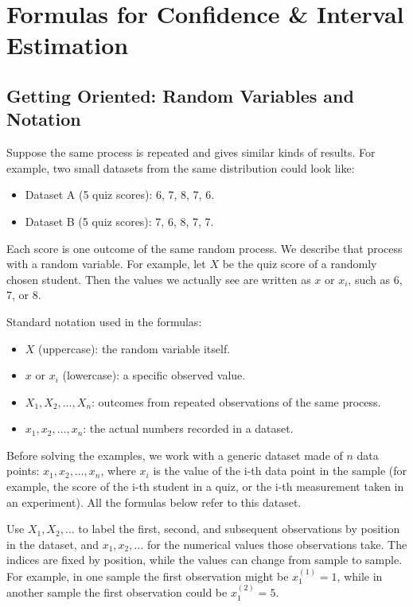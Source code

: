 \section{Formulas for Confidence \& Interval Estimation}\label{sec:interval-formulas}

\subsection{Getting Oriented: Random Variables and Notation}\label{sec:interval-notation}

Suppose the same process is repeated and gives similar kinds of results. For example, two small datasets from the same distribution could look like:

\begin{itemize}
	\item Dataset A (5 quiz scores): 6, 7, 8, 7, 6.
	\item Dataset B (5 quiz scores): 7, 6, 8, 7, 7.
\end{itemize}

Each score is one outcome of the same random process. We describe that process with a random variable. For example, let \(X\) be the quiz score of a randomly chosen student. Then the values we actually see are written as \(x\) or \(x_i\), such as 6, 7, or 8.

Standard notation used in the formulas:

\begin{itemize}
	\item \(X\) (uppercase): the random variable itself.
	\item \(x\) or \(x_i\) (lowercase): a specific observed value.
	\item \(X_1, X_2, \dots, X_n\): outcomes from repeated observations of the same process.
	\item \(x_1, x_2, \dots, x_n\): the actual numbers recorded in a dataset.
\end{itemize}

Before solving the examples, we work with a generic dataset made of \(n\) data points: \(x_1, x_2, \dots, x_n\), where \(x_i\) is the value of the i-th data point in the sample (for example, the score of the i-th student in a quiz, or the i-th measurement taken in an experiment). All the formulas below refer to this dataset.

Use \(X_1, X_2, \dots\) to label the first, second, and subsequent observations by position in the dataset, and \(x_1, x_2, \dots\) for the numerical values those observations take. The indices are fixed by position, while the values can change from sample to sample. For example, in one sample the first observation might be \(x_1^{(1)} = 1\), while in another sample the first observation could be \(x_1^{(2)} = 5\).

